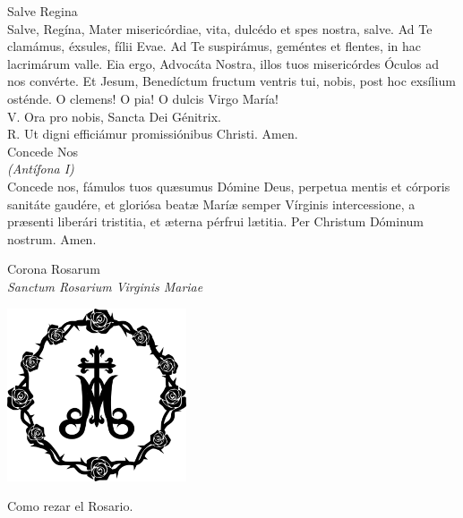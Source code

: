 \documentclass[letterpaper, landscape, 10pt, twocolumn]{article}
\begin{document}
  \Large {\color{red} Salve Regina}\\
  \normalsize {\color{red} S}alve, Regína, Mater misericórdiae, vita, dulcédo et spes nostra, salve. Ad Te clamámus, éxsules, fílii Evae. Ad Te suspirámus, geméntes et flentes, in hac lacrimárum valle. Eia ergo, Advocáta Nostra, illos tuos misericórdes Óculos ad nos convérte. Et Jesum, Benedíctum fructum ventris tui, nobis, post hoc exsílium osténde. O clemens! O pia! O dulcis Virgo María!\\
  {\color{red} V.} {\color{red} O}ra pro nobis, Sancta Dei Génitrix.\\
  {\color{red} R.} {\color{red} U}t digni efficiámur promissiónibus Christi. {\color{red} A}men.\\

  \Large {\color{red} Concede Nos}\\
  \normalsize {\color{red} \textit{(Antífona I)}}\\
  {\color{red} C}oncede nos, fámulos tuos quæsumus Dómine Deus, perpetua mentis et córporis sanitáte gaudére, et gloriósa beatæ Maríæ semper Vírginis intercessione, a præsenti liberári tristitia, et æterna pérfrui lætitia. Per Christum Dóminum nostrum. {\color{red} A}men.\\
  \vfill

  \begin{center}
    \Huge Corona Rosarum\\
    \large {\color{red} \textit{Sanctum Rosarium Virginis Mariae}}

    \vspace{1cm}
    \includegraphics{rosa2}
    \vspace{1cm}

    \Large Como rezar el Rosario.
  \end{center}
\end{document}
